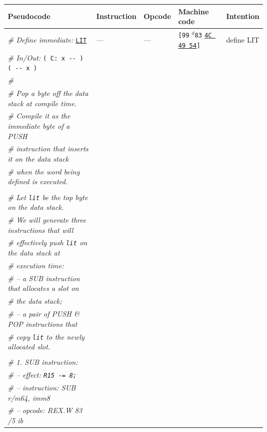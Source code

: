 \documentclass[a4paper,12pt,final]{article}
\begin{document}
\begin{table}[!htbp] \begin{adjustwidth}{-1cm}{-1cm} \fontsize{10}{12.000000}\selectfont
\begin{center}
\begin{tabular}{l|ll|lH}
\textbf{Pseudocode} & \textbf{Instruction} & \textbf{Opcode} & \textbf{Machine code} & \textbf{Intention}\\[0pt]
\hline
\emph{\# Define immediate:} \uline{\texttt{LIT}} & --- & --- & \texttt{[99} \(^{d}\)​\texttt{83} \uline{\texttt{4C 49 54}}​\texttt{]} & define LIT\\[0pt]
\emph{\# In/Out:} \texttt{( C: x -​- ) ( -{}-{} x )} &  &  &  & \\[0pt]
\emph{\#} &  &  &  & \\[0pt]
\emph{\# Pop a byte off the data stack at compile time.} &  &  &  & \\[0pt]
\emph{\# Compile it as the immediate byte of a PUSH} &  &  &  & \\[0pt]
\emph{\# instruction that inserts it on the data stack} &  &  &  & \\[0pt]
\emph{\# when the word being defined is executed.} &  &  &  & \\[0pt]
 &  &  &  & \\[0pt]
\emph{\# Let \texttt{lit} be the top byte on the data stack.} &  &  &  & \\[0pt]
\emph{\# We will generate three instructions that will} &  &  &  & \\[0pt]
\emph{\# effectively push \texttt{lit} on the data stack at} &  &  &  & \\[0pt]
\emph{\# execution time:} &  &  &  & \\[0pt]
\emph{\# – a SUB instruction that allocates a slot on} &  &  &  & \\[0pt]
\emph{\# the data stack;} &  &  &  & \\[0pt]
\emph{\# – a pair of PUSH \& POP instructions that} &  &  &  & \\[0pt]
\emph{\# copy \texttt{lit} to the newly allocated slot.} &  &  &  & \\[0pt]
 &  &  &  & \\[0pt]
\emph{\# 1. SUB instruction:} &  &  &  & \\[0pt]
\emph{\# – effect: \texttt{R15 -= 8;}} &  &  &  & \\[0pt]
\emph{\# – instruction: SUB r/m64, imm8} &  &  &  & \\[0pt]
\emph{\# – opcode: REX.W 83 /5 ib} &  &  &  & \\[0pt]

\end{tabular}
\end{center}
\end{adjustwidth}
\end{table}
\end{document}
